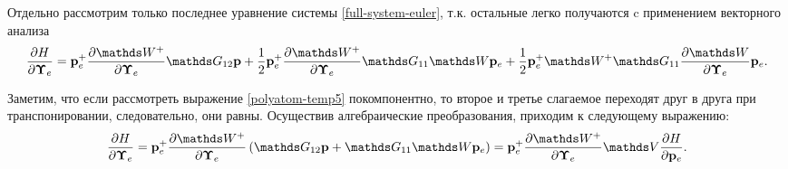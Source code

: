 Отдельно рассмотрим только последнее уравнение системы \eqref{full-system-euler}, т.к. остальные легко получаются c применением векторного анализа 
\begin{gather}
    \frac{\partial H}{\partial \bUpsilon} = \mf{p}_e^+ \frac{\partial \bbW^+}{\partial \bUpsilon} \bbG_{12} \mf{p} + \frac{1}{2} \mf{p}_e^+ \frac{\partial \bbW^+}{\partial \bUpsilon} \bbG_{11} \bbW \pe + \frac{1}{2} \mf{p}_e^+ \bbW^+ \bbG_{11} \frac{\partial \bbW}{\partial \bUpsilon} \pe. \label{polyatom-temp5} 
\end{gather}

Заметим, что если рассмотреть выражение \eqref{polyatom-temp5} покомпонентно, то второе и третье слагаемое переходят друг в друга при транспонировании, следовательно, они равны. Осуществив алгебраические преобразования, приходим к следующему выражению: 
\begin{gather}
    \frac{\partial H}{\partial \bUpsilon} = \mf{p}_e^+ \frac{\partial \bbW^+}{\partial \bUpsilon} \lb \bbG_{12} \mf{p} + \bbG_{11} \bbW \pe \rb = \mf{p}_e^+ \frac{\partial \bbW^+}{\partial \bUpsilon} \bbV \frac{\partial H}{\partial \pe}.
\end{gather}

